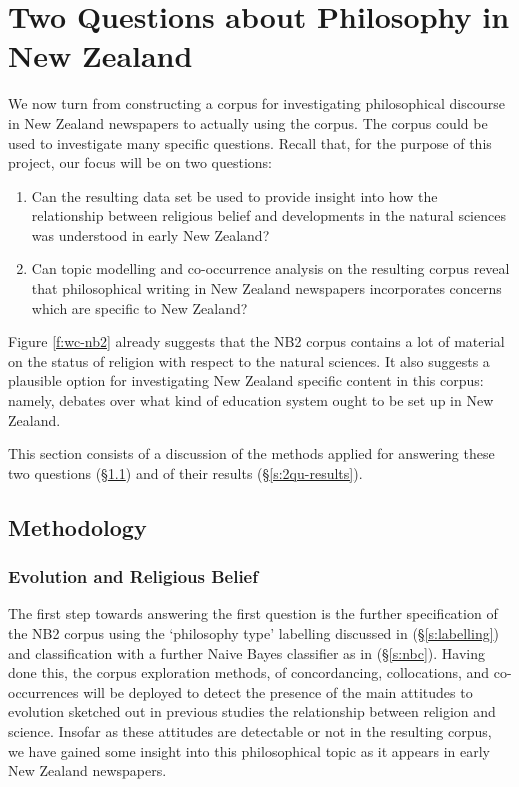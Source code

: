 \documentclass{article}
\begin{document}
\section{Two Questions about Philosophy in New Zealand}\label{s:investigation}

We now turn from constructing a corpus for investigating philosophical discourse in New Zealand newspapers to actually using the corpus. The corpus could be used to investigate many specific questions. Recall that, for the purpose of this project, our focus will be on two questions:
\begin{enumerate}
  \item Can the resulting data set be used to provide insight into how the relationship between religious belief and developments in the natural sciences was understood in early New Zealand?
  \item Can topic modelling and co-occurrence analysis on the resulting corpus reveal that philosophical writing in New Zealand newspapers incorporates concerns which are specific to New Zealand?
\end{enumerate}

Figure \ref{f:wc-nb2} already suggests that the NB2 corpus contains a lot of material on the status of religion with respect to the natural sciences. It also suggests a plausible option for investigating New Zealand specific content in this corpus: namely, debates over what kind of education system ought to be set up in New Zealand.

This section consists of a discussion of the methods applied for answering these two questions (\S \ref{s:2qu-methods}) and of their results (\S \ref{s:2qu-results}).

\subsection{Methodology}\label{s:2qu-methods}

\subsubsection{Evolution and Religious Belief}

The first step towards answering the first question is the further specification of the NB2 corpus using the `philosophy type' labelling discussed in (\S \ref{s:labelling}) and classification with a further Naive Bayes classifier as in (\S \ref{s:nbc}). Having done this, the corpus exploration methods, of concordancing, collocations, and co-occurrences will be deployed to detect the presence of the main attitudes to evolution sketched out in previous studies the relationship between religion and science. Insofar as these attitudes are detectable or not in the resulting corpus, we have gained some insight into this philosophical topic as it appears in early New Zealand newspapers.
\end{document}
